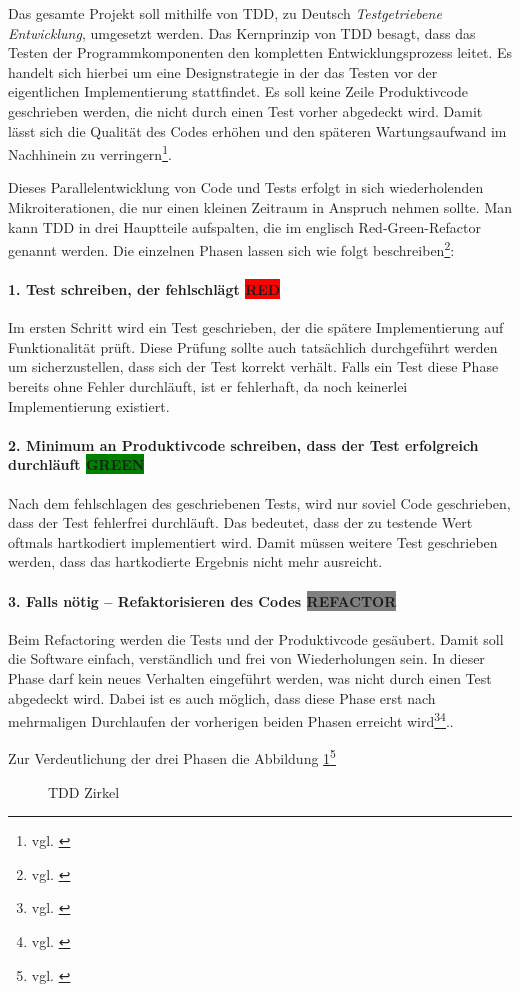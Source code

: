 


Das gesamte Projekt soll mithilfe von \ac{TDD}, zu Deutsch \textit{Testgetriebene Entwicklung}, umgesetzt werden. Das Kernprinzip von \acs{TDD} besagt, dass das Testen der Programmkomponenten den kompletten Entwicklungsprozess leitet.
Es handelt sich hierbei um eine Designstrategie in der das Testen vor der eigentlichen Implementierung stattfindet. Es soll keine Zeile Produktivcode geschrieben werden, die nicht durch einen Test vorher abgedeckt wird.
Damit lässt sich die Qualität des Codes erhöhen und den späteren Wartungsaufwand im Nachhinein zu verringern\footnote{vgl. \cite{datenschutzbeauftragter}}.

Dieses Parallelentwicklung von Code und Tests erfolgt in sich wiederholenden Mikroiterationen, die nur einen kleinen Zeitraum in Anspruch nehmen sollte. Man kann \acs{TDD} in drei Hauptteile aufspalten, die im englisch Red-Green-Refactor genannt werden. Die einzelnen Phasen lassen sich wie folgt beschreiben\footnote{vgl. \cite{tddwiki}}:

\paragraph{1. Test schreiben, der fehlschlägt \colorbox{red}{RED}}
Im ersten Schritt wird ein Test geschrieben, der die spätere Implementierung auf Funktionalität prüft. Diese Prüfung sollte auch tatsächlich durchgeführt werden um sicherzustellen, dass sich der Test korrekt verhält. Falls ein Test diese Phase bereits ohne Fehler durchläuft, ist er fehlerhaft, da noch keinerlei Implementierung existiert.

\paragraph{2. Minimum an Produktivcode schreiben, dass der Test erfolgreich durchläuft \colorbox{green}{GREEN}}
Nach dem fehlschlagen des geschriebenen Tests, wird nur soviel Code geschrieben, dass der Test fehlerfrei durchläuft. 
Das bedeutet, dass der zu testende Wert oftmals hartkodiert implementiert wird. Damit müssen weitere Test geschrieben werden, dass das hartkodierte Ergebnis nicht mehr ausreicht.

\paragraph{3. Falls nötig – Refaktorisieren des Codes \colorbox{gray}{REFACTOR}}
Beim Refactoring werden die Tests und der Produktivcode gesäubert. Damit soll die Software einfach, verständlich und frei von Wiederholungen sein. In dieser Phase darf kein neues Verhalten eingeführt werden, was nicht durch einen Test abgedeckt wird. Dabei ist es auch möglich, dass diese Phase erst nach mehrmaligen Durchlaufen der vorherigen beiden Phasen erreicht wird\footnote{vgl. \cite{tdd-ryte}}\footnote{vgl. \cite{tdd-improuv}}..

Zur Verdeutlichung der drei Phasen die Abbildung \ref{fig:tddcircle}\footnote{vgl. \cite{tddcircle}}

\begin{figure}[htb]
\centering
{}
\caption{TDD Zirkel}
\label{fig:tddcircle}%
\end{figure}
